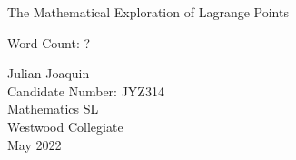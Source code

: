 \begin{titlepage}
	\begin{center}
		\vspace*{\fill}
		
		The Mathematical Exploration of Lagrange Points
		
		\vspace*{1.0cm}
		Word Count: ?
		
		\vfill
		
		Julian Joaquin\\
		Candidate Number: JYZ314\\
		Mathematics SL \\
		Westwood Collegiate \\
		May 2022
		
		\vspace*{\fill}
		
	\end{center}
\end{titlepage}
